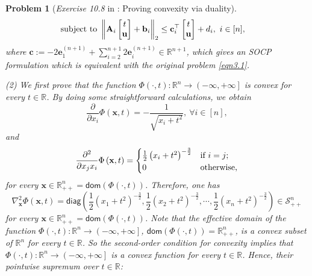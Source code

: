 \documentclass[11pt]{article}
\newtheorem{problem}{Problem}
\numberwithin{equation}{problem}
\begin{document}
\begin{problem} [\emph{Exercise 10.8} in \cite{calafiore2014optimization}: Proving convexity via duality]
{\begin{equation}
\begin{split}
        \textnormal{subject to } &\left\| \mathbf{A}_i \begin{bmatrix} t \\ \mathbf{u} \end{bmatrix} + \mathbf{b}_i \right\|_{2} \leq \mathbf{c}_{i}^{\top} \begin{bmatrix} t \\ \mathbf{u} \end{bmatrix} + d_i,\ i \in [n],
    \end{split}
\end{equation}
where $\mathbf{c} := - 2 \mathbf{e}_{1}^{(n+1)} + \sum_{i=2}^{n+1} 2 \mathbf{e}_{i}^{(n+1)} \in \mathbb{R}^{n+1}$, which gives an SOCP formulation which is equivalent with the original problem \eqref{eqn3.1}. 
\medskip

\indent (2) We first prove that the function $\Phi \left( \cdot, t \right) : \mathbb{R}^n \rightarrow \left( -\infty, +\infty \right]$ is convex for every $t \in \mathbb{R}$. By doing some straightforward calculations, we obtain
\begin{equation*}
    \frac{\partial}{\partial x_i} \Phi \left( \mathbf{x}, t \right) = - \frac{1}{\sqrt{x_i + t^2}},\ \forall i \in [n],
\end{equation*}
and
\begin{equation*}
    \frac{\partial^2}{\partial x_j x_i} \Phi \left( \mathbf{x}, t \right) =
    \begin{cases}
        \frac{1}{2} \left( x_i + t^2 \right)^{- \frac{3}{2}} & \textnormal{if } i = j; \\
        0 & \textnormal{otherwise,}
    \end{cases}
\end{equation*}
for every $\mathbf{x} \in \mathbb{R}_{++}^{n} = \textsf{dom} \left( \Phi \left( \cdot, t \right) \right)$. Therefore, one has
\begin{equation*}
    \nabla_{\mathbf{x}}^2 \Phi \left( \mathbf{x}, t \right)
    = \textsf{diag} \left( \frac{1}{2} \left( x_1 + t^2 \right)^{- \frac{3}{2}}, \frac{1}{2} \left( x_2 + t^2 \right)^{- \frac{3}{2}}, \cdots, \frac{1}{2} \left( x_n + t^2 \right)^{- \frac{3}{2}} \right) \in \mathcal{S}_{++}^{n}
\end{equation*}
for every $\mathbf{x} \in \mathbb{R}_{++}^{n} = \textsf{dom} \left( \Phi \left( \cdot, t \right) \right)$. Note that the effective domain of the function $\Phi \left( \cdot, t \right) : \mathbb{R}^n \rightarrow \left( -\infty, +\infty \right]$, $\textsf{dom} \left( \Phi \left( \cdot, t \right) \right) = \mathbb{R}_{++}^n$, is a convex subset of $\mathbb{R}^n$ for every $t \in \mathbb{R}$. So the second-order condition for convexity implies that $\Phi \left( \cdot, t \right) : \mathbb{R}^n \rightarrow \left( -\infty, +\infty \right]$ is a convex function for every $t \in \mathbb{R}$. Hence, their pointwise supremum over $t \in \mathbb{R}$:
}
\end{problem}
\end{document}
